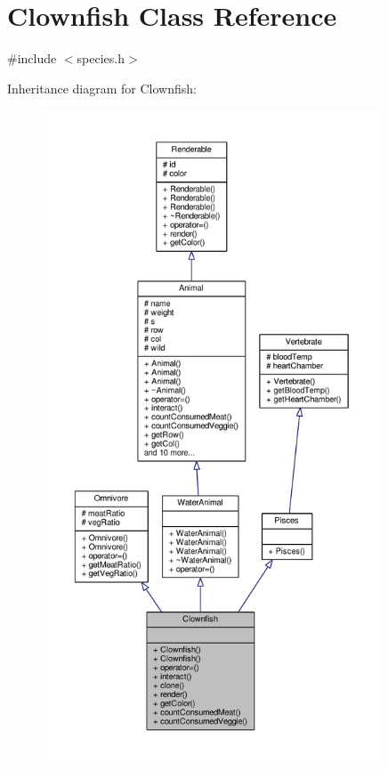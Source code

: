 \hypertarget{classClownfish}{}\section{Clownfish Class Reference}
\label{classClownfish}


{\ttfamily \#include $<$species.\+h$>$}



Inheritance diagram for Clownfish\+:
\nopagebreak
\begin{figure}[H]
\begin{center}
\leavevmode
\includegraphics[height=550pt]{classClownfish__inherit__graph}
\end{center}
\end{figure}


